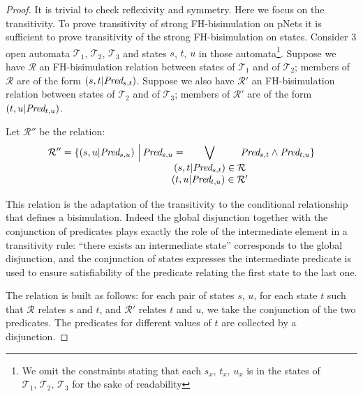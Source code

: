 \documentclass{lmcs}
\begin{document}
              \begin{proof}
       	
       	It is trivial to check reflexivity and symmetry. Here we focus on the
       	transitivity. 
       	To prove transitivity of strong FH-bisimulation on pNets it is sufficient to 
       	prove 
       	transitivity of the strong FH-bisimulation on states. Consider 3 open automata 
       	$\mathcal{T}_1$, $\mathcal{T}_2$, $\mathcal{T}_3$ and states $s$, $t$, $u$ 
       	in those 
       	automata\footnote{We omit the constraints stating that each $s_x,\,t_x,\,u_x$ is 
       	in the 
       	states of 
       		$\mathcal{T}_1,\,\mathcal{T}_2,\,\mathcal{T}_3$ for the sake of readability}.
       	Suppose we have $\mathcal{R}$ an FH-bisimulation relation between states of 
       	$\mathcal{T}_1$ and of  $\mathcal{T}_2$; members of $\mathcal{R}$ are of the form 
       	$(s,t|\Pred_{s,t})$.
       	Suppose we also  have $\mathcal{R}'$ an FH-bisimulation relation between states 
       	of 
       	$\mathcal{T}_2$ and of  $\mathcal{T}_3$; members of $\mathcal{R}'$ are of the 
       	form 
       	$(t,u|\Pred_{t,u})$.
       	
       	Let $\mathcal{R}''$ be the relation: 
       	\[\mathcal{R}'' = 
       	\{(s,u|\Pred_{s,u})\,\,\Big|\,\Pred_{s,u}=\hspace{-0.7cm}\bigvee_{\begin{array}{c}       		
       		(s,t|\Pred_{s,t})\in\mathcal{R}\\ (t,u|\Pred_{t,u})\in\mathcal{R}' 	
       		\end{array}
       }\hspace{-0.5cm}\Pred_{s,t}\land\Pred_{t,u}\}\]

This relation is the adaptation of the transitivity to the conditional relationship that 
defines a bisimulation. Indeed the global disjunction together with the conjunction of 
predicates plays exactly the role of the intermediate element in a transitivity rule: 
``there exists an intermediate state'' corresponds to the global disjunction, and the 
conjunction of states expresses the intermediate predicate is used to ensure 
satisfiability of the predicate relating the first state to the last one.
       	
       	The relation is built as follows: for each pair of states $s$, $u$, for each 
       	state 
       	$t$ such that $\mathcal{R}$ relates $s$ and $t$, and $\mathcal{R}'$ relates 
       	$t$ 
       	and $u$, we take the conjunction of the two predicates. The predicates for 
       	different 
       	values of $t$ are collected by a disjunction. 
       	

\end{proof}
\end{document}
